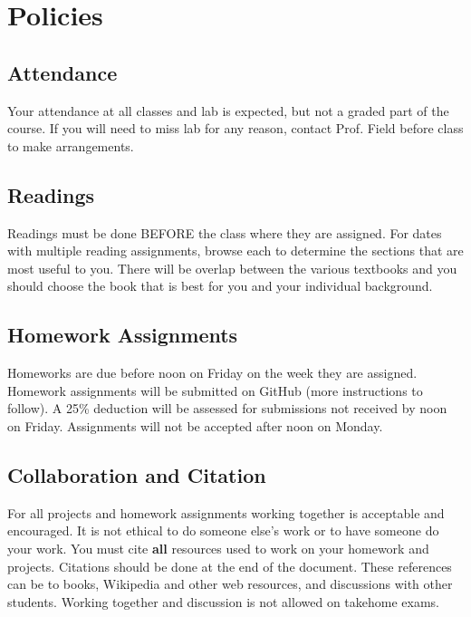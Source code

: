 \documentclass[11pt]{article} %
\begin{document}
\FloatBarrier



\section{Policies}

  \subsection{Attendance}
  
    Your attendance at all classes and lab is expected, but not a graded part of the course. If you will need to miss lab for any reason, contact Prof. Field before class to make arrangements.
  
  \subsection{Readings}
  
    Readings must be done BEFORE the class where they are assigned. For dates with multiple reading assignments, browse each to determine the sections that are most useful to you. There will be overlap between the various textbooks and you should choose the book that is best for you and your individual background.
  
  \subsection{Homework Assignments}
  
    Homeworks are due before noon on Friday on the week they are assigned.
    Homework assignments will be submitted on GitHub (more instructions to follow).
    A 25\% deduction will be assessed for submissions not received by noon on Friday. Assignments will not be accepted after noon on Monday.
  
  \subsection{Collaboration and Citation}
  
    For all projects and homework assignments working together is acceptable and encouraged. 
    It is not ethical to do someone else's work or to have someone do your work. 
    You must cite \textbf{all} resources used to work on your homework and projects. 
    Citations should be done at the end of the document. 
    These references can be to books, Wikipedia and other web resources, and discussions with other students. 
    Working together and discussion is not allowed on takehome exams.
  
\end{document}
